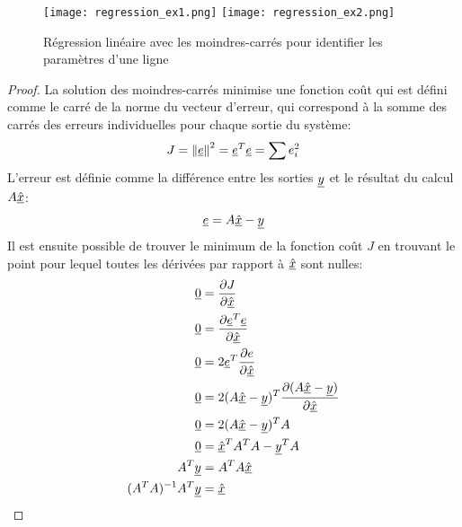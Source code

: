 \begin{example}
\begin{figure}[H]
	\centering
		\texttt{[image: regression\_ex1.png]}
		\texttt{[image: regression\_ex2.png]}
	\caption{Régression linéaire avec les moindres-carrés pour identifier les paramètres d'une ligne}
	\label{fig:regression-ex1}
\end{figure}
\end{example}

\begin{proof}
La solution des moindres-carrés minimise une fonction coût qui est défini comme le carré de la norme du vecteur d'erreur, qui correspond à la somme des carrés des erreurs individuelles pour chaque sortie du système:
\begin{align}
J = \left\| \underline{e} \right\|^2  = \underline{e}^T\underline{e} = \sum{ e_i^2}
\end{align}
L'erreur est définie comme la différence entre les sorties $\underline{y}$ et le résultat du calcul $A \underline{\hat{x}}$:
\begin{align}
\underline{e} = A \underline{\hat{x}} - \underline{y}
\end{align}
Il est ensuite possible de trouver le minimum de la fonction coût $J$ en trouvant le point pour lequel toutes les dérivées par rapport à $\underline{\hat{x}}$ sont nulles:
\begin{align}
\underline{0} &= \frac{\partial J}{\partial \underline{\hat{x}}} \\
\underline{0} &= \frac{\partial \underline{e}^T\underline{e}}{\partial \underline{\hat{x}}} \\
\underline{0} &= 2 \underline{e}^T \frac{\partial e }{\partial \underline{\hat{x}}} \\
\underline{0} &= 2 ( A \underline{\hat{x}} -\underline{y} )^T \frac{\partial (A \underline{\hat{x}} -\underline{y}) }{\partial \underline{\hat{x}}} \\
\underline{0} &= 2 ( A \underline{\hat{x}} -\underline{y}  )^T A  \\
\underline{0} &=  \underline{\hat{x}}^T A^T A  - \underline{y}^T A   \\
A^T \underline{y} &= A^T A \underline{\hat{x}} \\
(A^T A)^{-1} A^T \underline{y} &= \underline{\hat{x}} 
\end{align}
\end{proof}

